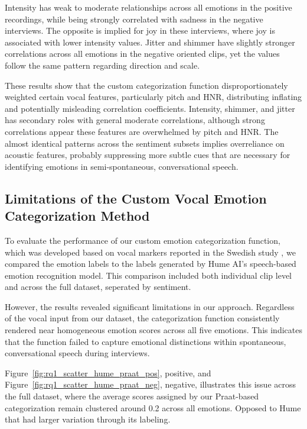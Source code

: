 Intensity has weak to moderate relationships across all emotions in the positive recordings, while being strongly correlated with sadness in the negative interviews. The opposite is implied for joy in these interviews, where joy is associated with lower intensity values. 
Jitter and shimmer have slightly stronger correlations across all emotions in the negative oriented clips, yet the values follow the same pattern regarding direction and scale. 

\medskip
These results show that the custom categorization function disproportionately weighted certain vocal features, particularly pitch and HNR, distributing inflating and potentially misleading correlation coefficients. Intensity, shimmer, and jitter has secondary roles with general moderate correlations, although strong correlations appear these features are overwhelmed by pitch and HNR. The almost identical patterns across the sentiment subsets implies overreliance on acoustic features, probably suppressing more subtle cues that are necessary for identifying emotions in semi-spontaneous, conversational speech. 


\subsection{Limitations of the Custom Vocal Emotion Categorization Method}
To evaluate the performance of our custom emotion categorization function, which was developed based on vocal markers reported in the Swedish study \autocite{Ekberg2023}, we compared the emotion labels to the labels generated by Hume AI’s speech-based emotion recognition model. This comparison included both individual clip level and across the full dataset, seperated by sentiment. 

However, the results revealed significant limitations in our approach. Regardless of the vocal input from our dataset, the categorization function consistently rendered near homogeneous emotion scores across all five emotions. This indicates that the function failed to capture emotional distinctions within spontaneous, conversational speech during interviews. 

Figure~\ref{fig:rq1_scatter_hume_praat_pos}, positive, and Figure~\ref{fig:rq1_scatter_hume_praat_neg}, negative, illustrates this issue across the full dataset, where the average scores assigned by our Praat-based categorization remain clustered around 0.2 across all emotions. Opposed to Hume that had larger variation through its labeling. 

